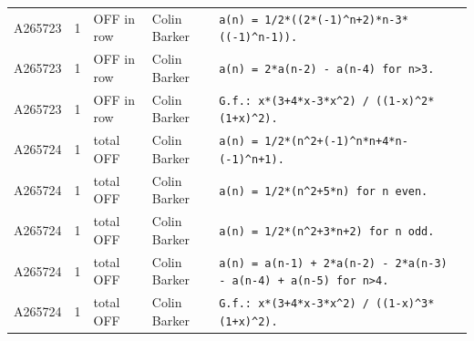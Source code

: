 \documentclass[11pt]{article}
\theoremstyle{definition}
\theoremstyle{remark}
\begin{document}
{\begin{longtable}{p{1.3cm}p{0.7cm}p{2.4cm}p{2.3cm}p{7.3cm}}
A265723 & 1 & OFF in row & Colin Barker & \texttt{a(n)\allowbreak{} \allowbreak{}=\allowbreak{} \allowbreak{}1/\allowbreak{}2*\allowbreak{}((2*\allowbreak{}(-\allowbreak{}1)\allowbreak{}\^{}n+\allowbreak{}2)\allowbreak{}*\allowbreak{}n-\allowbreak{}3*\allowbreak{}((-\allowbreak{}1)\allowbreak{}\^{}n-\allowbreak{}1)\allowbreak{})\allowbreak{}.} \\
A265723 & 1 & OFF in row & Colin Barker & \texttt{a(n)\allowbreak{} \allowbreak{}=\allowbreak{} \allowbreak{}2*\allowbreak{}a(n-\allowbreak{}2)\allowbreak{} \allowbreak{}-\allowbreak{} \allowbreak{}a(n-\allowbreak{}4)\allowbreak{} \allowbreak{}for \allowbreak{}n>3.} \\
A265723 & 1 & OFF in row & Colin Barker & \texttt{G.f.: \allowbreak{}x*\allowbreak{}(3+\allowbreak{}4*\allowbreak{}x-\allowbreak{}3*\allowbreak{}x\^{}2)\allowbreak{} \allowbreak{}/\allowbreak{} \allowbreak{}((1-\allowbreak{}x)\allowbreak{}\^{}2*\allowbreak{}(1+\allowbreak{}x)\allowbreak{}\^{}2)\allowbreak{}.} \\
A265724 & 1 & total OFF & Colin Barker & \texttt{a(n)\allowbreak{} \allowbreak{}=\allowbreak{} \allowbreak{}1/\allowbreak{}2*\allowbreak{}(n\^{}2+\allowbreak{}(-\allowbreak{}1)\allowbreak{}\^{}n*\allowbreak{}n+\allowbreak{}4*\allowbreak{}n-\allowbreak{}(-\allowbreak{}1)\allowbreak{}\^{}n+\allowbreak{}1)\allowbreak{}.} \\
A265724 & 1 & total OFF & Colin Barker & \texttt{a(n)\allowbreak{} \allowbreak{}=\allowbreak{} \allowbreak{}1/\allowbreak{}2*\allowbreak{}(n\^{}2+\allowbreak{}5*\allowbreak{}n)\allowbreak{} \allowbreak{}for \allowbreak{}n \allowbreak{}even.} \\
A265724 & 1 & total OFF & Colin Barker & \texttt{a(n)\allowbreak{} \allowbreak{}=\allowbreak{} \allowbreak{}1/\allowbreak{}2*\allowbreak{}(n\^{}2+\allowbreak{}3*\allowbreak{}n+\allowbreak{}2)\allowbreak{} \allowbreak{}for \allowbreak{}n \allowbreak{}odd.} \\
A265724 & 1 & total OFF & Colin Barker & \texttt{a(n)\allowbreak{} \allowbreak{}=\allowbreak{} \allowbreak{}a(n-\allowbreak{}1)\allowbreak{} \allowbreak{}+\allowbreak{} \allowbreak{}2*\allowbreak{}a(n-\allowbreak{}2)\allowbreak{} \allowbreak{}-\allowbreak{} \allowbreak{}2*\allowbreak{}a(n-\allowbreak{}3)\allowbreak{} \allowbreak{}-\allowbreak{} \allowbreak{}a(n-\allowbreak{}4)\allowbreak{} \allowbreak{}+\allowbreak{} \allowbreak{}a(n-\allowbreak{}5)\allowbreak{} \allowbreak{}for \allowbreak{}n>4.} \\
A265724 & 1 & total OFF & Colin Barker & \texttt{G.f.: \allowbreak{}x*\allowbreak{}(3+\allowbreak{}4*\allowbreak{}x-\allowbreak{}3*\allowbreak{}x\^{}2)\allowbreak{} \allowbreak{}/\allowbreak{} \allowbreak{}((1-\allowbreak{}x)\allowbreak{}\^{}3*\allowbreak{}(1+\allowbreak{}x)\allowbreak{}\^{}2)\allowbreak{}.} \\

\end{longtable}}
\end{document}

